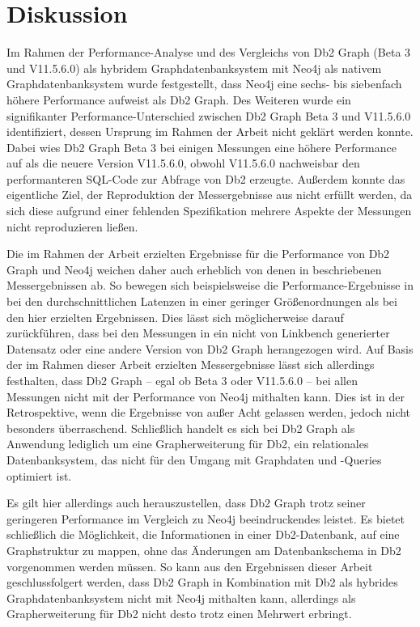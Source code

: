 \chapter{Diskussion}
\label{diskussion}
Im Rahmen der Performance-Analyse und des Vergleichs von Db2 Graph (Beta 3 und V11.5.6.0) als hybridem Graphdatenbanksystem mit Neo4j als nativem Graphdatenbanksystem wurde festgestellt, dass Neo4j eine sechs- bis siebenfach höhere Performance aufweist als Db2 Graph. Des Weiteren wurde ein signifikanter Performance-Unterschied zwischen Db2 Graph Beta 3 und V11.5.6.0 identifiziert, dessen Ursprung im Rahmen der Arbeit nicht geklärt werden konnte. Dabei wies Db2 Graph Beta 3 bei einigen Messungen eine höhere Performance auf als die neuere Version V11.5.6.0, obwohl V11.5.6.0 nachweisbar den performanteren SQL-Code zur Abfrage von Db2 erzeugte. Außerdem konnte das eigentliche Ziel, der Reproduktion der Messergebnisse aus \cite{sigmod_tian} nicht erfüllt werden, da sich diese aufgrund einer fehlenden Spezifikation mehrere Aspekte der Messungen nicht reproduzieren ließen. 

Die im Rahmen der Arbeit erzielten Ergebnisse für die Performance von Db2 Graph und Neo4j weichen daher auch erheblich von denen in \cite{sigmod_tian} beschriebenen Messergebnissen ab. So bewegen sich beispielsweise die Performance-Ergebnisse in \cite{sigmod_tian} bei den durchschnittlichen Latenzen in einer geringer  Größenordnungen als bei den hier erzielten Ergebnissen. Dies lässt sich möglicherweise darauf zurückführen, dass bei den Messungen in \cite{sigmod_tian} ein nicht von Linkbench generierter Datensatz oder eine andere Version von Db2 Graph herangezogen wird. Auf Basis der im Rahmen dieser Arbeit erzielten Messergebnisse lässt sich allerdings festhalten, dass Db2 Graph -- egal ob Beta 3 oder V11.5.6.0 -- bei allen Messungen nicht mit der Performance von Neo4j mithalten kann. Dies ist in der Retrospektive, wenn die Ergebnisse von \cite{sigmod_tian} außer Acht gelassen werden, jedoch nicht besonders überraschend. Schließlich handelt es sich bei Db2 Graph als Anwendung lediglich um eine Grapherweiterung für Db2, ein relationales Datenbanksystem, das nicht für den Umgang mit Graphdaten und -Queries optimiert ist. 

Es gilt hier allerdings auch herauszustellen, dass Db2 Graph trotz seiner geringeren Performance im Vergleich zu Neo4j beeindruckendes leistet. Es bietet schließlich die Möglichkeit, die Informationen in einer Db2-Datenbank, auf eine Graphstruktur zu mappen, ohne das Änderungen am Datenbankschema in Db2 vorgenommen werden müssen. So kann aus den Ergebnissen dieser Arbeit geschlussfolgert werden, dass Db2 Graph in Kombination mit Db2 als hybrides Graphdatenbanksystem nicht mit Neo4j mithalten kann, allerdings als Grapherweiterung für Db2 nicht desto trotz einen Mehrwert erbringt. 

